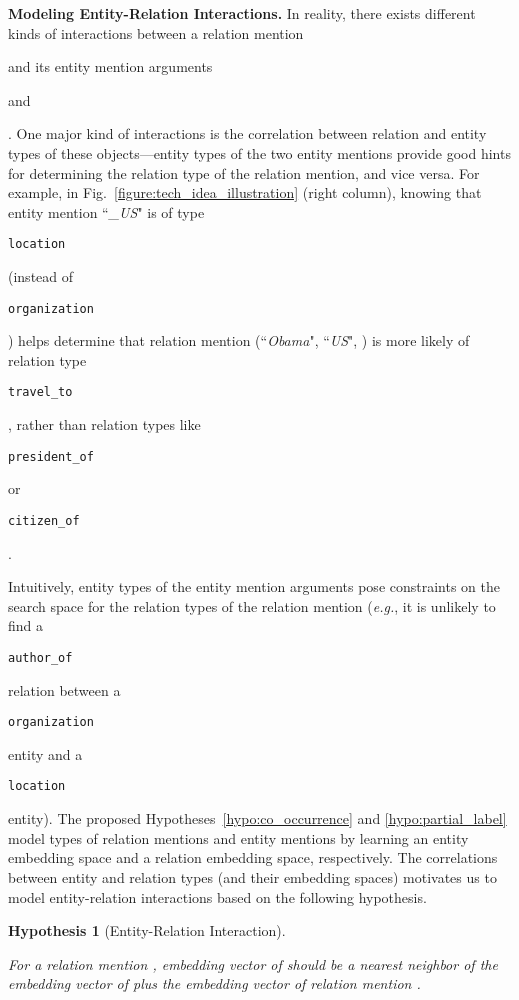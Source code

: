 \documentclass[letterpaper]{sig-alternate-2013}
\newtheorem{hypothesis}{Hypothesis}
\def\eg{{\sl e.g.}}
\begin{document}
\medskip\noindent 
\textsf{\small\textbf{Modeling Entity-Relation Interactions.}}
In reality, there exists different kinds of interactions between a relation mention \begin{small}\end{small} and its entity mention arguments \begin{small}\end{small} and \begin{small}\end{small}. One major kind of interactions is the correlation between relation and entity types of these objects---entity types of the two entity mentions provide good hints for determining the relation type of the relation mention, and vice versa.
For example, in Fig.~\ref{figure:tech_idea_illustration} (right column), knowing that entity mention ``\textit{\_US}" is of type \begin{small}\texttt{location}\end{small} (instead of \begin{small}\texttt{organization}\end{small}) helps determine that relation mention (``\textit{Obama}", ``\textit{US}", ) is more likely of relation type \begin{small}\texttt{travel\_to}\end{small}, rather than relation types like \begin{small}\texttt{president\_of}\end{small} or \begin{small}\texttt{citizen\_of}\end{small}.

Intuitively, entity types of the entity mention arguments pose constraints on the search space for the relation types of the relation mention (\eg, it is unlikely to find a \begin{small}\texttt{author\_of}\end{small} relation between a \begin{small}\texttt{organization}\end{small} entity and a \begin{small}\texttt{location}\end{small} entity). The proposed Hypotheses~\ref{hypo:co_occurrence} and \ref{hypo:partial_label} model types of relation mentions and entity mentions by learning an entity embedding space and a relation embedding space, respectively. The correlations between entity and relation types (and their embedding spaces) motivates us to model entity-relation interactions based on the following hypothesis.
\begin{hypothesis}[Entity-Relation Interaction]
\label{hypo:entity_relation}

For a relation mention , embedding vector of  should be a nearest neighbor of the embedding vector of  plus the embedding vector of relation mention .
\end{hypothesis}
\end{document}
